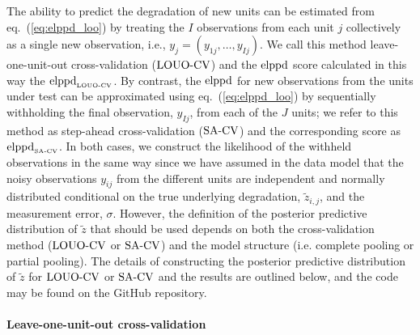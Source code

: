 The ability to predict the degradation of new units can be estimated from eq.~(\ref{eq:elppd_loo}) by treating the $I$ observations from each unit $j$ collectively as a single new observation, i.e., $y_j = (y_{1j}, \ldots, y_{Ij})$. We call this method leave-one-unit-out cross-validation ($\hbox{LOUO-CV}$) and the $\hbox{elppd}$ score calculated in this way the $\hbox{elppd}_{\hbox{\tiny{LOUO-CV}}}$. By contrast, the $\hbox{elppd}$ for new observations from the units under test can be approximated using eq.~(\ref{eq:elppd_loo}) by sequentially withholding the final observation, $y_{Ij}$, from each of the $J$ units; we refer to this method as step-ahead cross-validation ($\hbox{SA-CV}$) and the corresponding score as $\hbox{elppd}_{\hbox{\tiny{SA-CV}}}$. In both cases, we construct the likelihood of the withheld observations in the same way since we have assumed in the data model that the noisy observations $y_{ij}$ from the different units are independent and normally distributed conditional on the true underlying degradation, $\tilde{z}_{i, j}$, and the measurement error, $\sigma$. However, the definition of the posterior predictive distribution of $\tilde{z}$ that should be used depends on both the cross-validation method ($\hbox{LOUO-CV}$ or $\hbox{SA-CV}$) and the model structure (i.e. complete pooling or partial pooling). The details of constructing the posterior predictive distribution of $\tilde{z}$ for $\hbox{LOUO-CV}$ or $\hbox{SA-CV}$ and the results are outlined below, and the code may be found on the GitHub repository.



\paragraph{Leave-one-unit-out cross-validation} 

